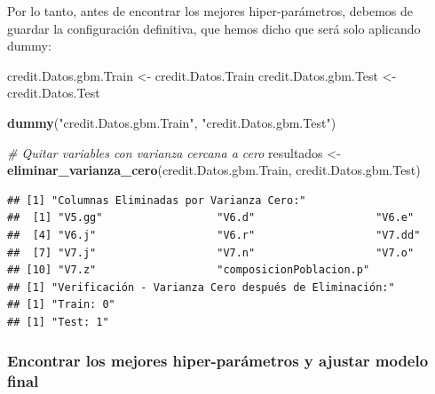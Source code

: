 \documentclass[
]{article}
\newenvironment{Shaded}{\begin{snugshade}}{\end{snugshade}}
\newcommand{\CommentTok}[1]{\textcolor[rgb]{0.56,0.35,0.01}{\textit{#1}}}
\newcommand{\FunctionTok}[1]{\textcolor[rgb]{0.13,0.29,0.53}{\textbf{#1}}}
\newcommand{\NormalTok}[1]{#1}
\newcommand{\OtherTok}[1]{\textcolor[rgb]{0.56,0.35,0.01}{#1}}
\newcommand{\SpecialCharTok}[1]{\textcolor[rgb]{0.81,0.36,0.00}{\textbf{#1}}}
\newcommand{\StringTok}[1]{\textcolor[rgb]{0.31,0.60,0.02}{#1}}
\begin{document}
Por lo tanto, antes de encontrar los mejores hiper-parámetros, debemos
de guardar la configuración definitiva, que hemos dicho que será solo
aplicando dummy:

\begin{Shaded}
\begin{Highlighting}[]
\NormalTok{credit.Datos.gbm.Train }\OtherTok{\textless{}{-}}\NormalTok{ credit.Datos.Train}
\NormalTok{credit.Datos.gbm.Test }\OtherTok{\textless{}{-}}\NormalTok{ credit.Datos.Test}

\FunctionTok{dummy}\NormalTok{(}\StringTok{"credit.Datos.gbm.Train"}\NormalTok{, }\StringTok{"credit.Datos.gbm.Test"}\NormalTok{)}

\CommentTok{\# Quitar variables con varianza cercana a cero}
\NormalTok{resultados }\OtherTok{\textless{}{-}} \FunctionTok{eliminar\_varianza\_cero}\NormalTok{(credit.Datos.gbm.Train, credit.Datos.gbm.Test)}
\end{Highlighting}
\end{Shaded}

\begin{verbatim}
## [1] "Columnas Eliminadas por Varianza Cero:"
##  [1] "V5.gg"                  "V6.d"                   "V6.e"                  
##  [4] "V6.j"                   "V6.r"                   "V7.dd"                 
##  [7] "V7.j"                   "V7.n"                   "V7.o"                  
## [10] "V7.z"                   "composicionPoblacion.p"
## [1] "Verificación - Varianza Cero después de Eliminación:"
## [1] "Train: 0"
## [1] "Test: 1"
\end{verbatim}

\begin{Shaded}
\end{Shaded}

\hypertarget{encontrar-los-mejores-hiper-paruxe1metros-y-ajustar-modelo-final}{%
\subsubsection{Encontrar los mejores hiper-parámetros y ajustar modelo
final}\label{encontrar-los-mejores-hiper-paruxe1metros-y-ajustar-modelo-final}}
\end{document}

